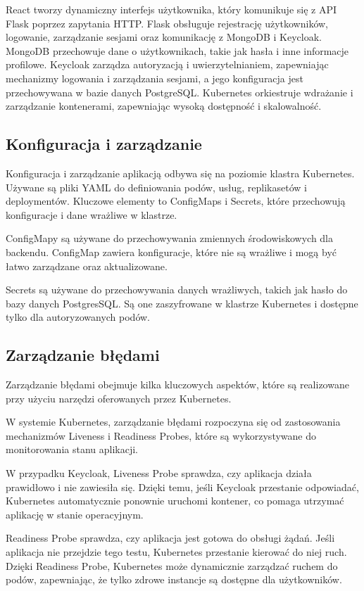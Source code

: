 \documentclass[12pt,a4paper]{article}
\begin{document}
React tworzy dynamiczny interfejs użytkownika, który komunikuje się z API Flask poprzez zapytania HTTP. Flask obsługuje rejestrację użytkowników, logowanie, zarządzanie sesjami oraz komunikację z MongoDB i Keycloak. MongoDB przechowuje dane o użytkownikach, takie jak hasła i inne informacje profilowe. Keycloak zarządza autoryzacją i uwierzytelnianiem, zapewniając mechanizmy logowania i zarządzania sesjami, a jego konfiguracja jest przechowywana w bazie danych PostgreSQL. Kubernetes orkiestruje wdrażanie i zarządzanie kontenerami, zapewniając wysoką dostępność i skalowalność.

\subsection{Konfiguracja i zarządzanie}
\label{sec:NonFunctionalConditions}

Konfiguracja i zarządzanie aplikacją odbywa się na poziomie klastra Kubernetes. Używane są pliki YAML do definiowania podów, usług, replikasetów i deploymentów. Kluczowe elementy to ConfigMaps i Secrets, które przechowują konfiguracje i dane wrażliwe w klastrze.

ConfigMapy są używane do przechowywania zmiennych środowiskowych dla backendu. ConfigMap zawiera konfiguracje, które nie są wrażliwe i mogą być łatwo zarządzane oraz aktualizowane. 

Secrets są używane do przechowywania danych wrażliwych, takich jak hasło do bazy danych PostgresSQL. Są one zaszyfrowane w klastrze Kubernetes i dostępne tylko dla autoryzowanych podów.

\subsection{Zarządzanie błędami}
\label{sec:ERD} 

Zarządzanie błędami obejmuje kilka kluczowych aspektów, które są realizowane przy użyciu narzędzi oferowanych przez Kubernetes.

W systemie Kubernetes, zarządzanie błędami rozpoczyna się od zastosowania mechanizmów Liveness i Readiness Probes, które są wykorzystywane do monitorowania stanu aplikacji.

W przypadku Keycloak, Liveness Probe sprawdza, czy aplikacja działa prawidłowo i nie zawiesiła się.  Dzięki temu, jeśli Keycloak przestanie odpowiadać, Kubernetes automatycznie ponownie uruchomi kontener, co pomaga utrzymać aplikację w stanie operacyjnym.

Readiness Probe sprawdza, czy aplikacja jest gotowa do obsługi żądań. Jeśli aplikacja nie przejdzie tego testu, Kubernetes przestanie kierować do niej ruch. Dzięki Readiness Probe, Kubernetes może dynamicznie zarządzać ruchem do podów, zapewniając, że tylko zdrowe instancje są dostępne dla użytkowników.
\end{document}
